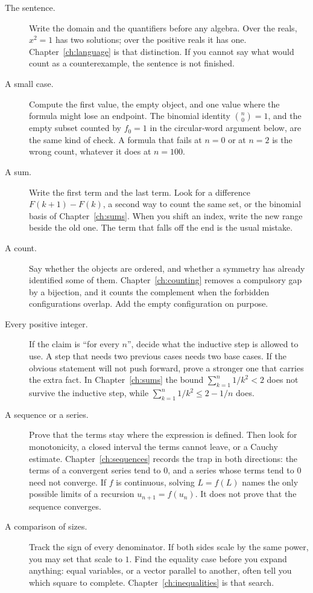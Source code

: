 \begin{description}
\item[The sentence.] Write the domain and the quantifiers before any algebra. Over the reals, $x^2=1$ has two solutions; over the positive reals it has one. Chapter~\ref{ch:language} is that distinction. If you cannot say what would count as a counterexample, the sentence is not finished.
\item[A small case.] Compute the first value, the empty object, and one value where the formula might lose an endpoint. The binomial identity $\binom n0=1$, and the empty subset counted by $f_0=1$ in the circular-word argument below, are the same kind of check. A formula that fails at $n=0$ or at $n=2$ is the wrong count, whatever it does at $n=100$.
\item[A sum.] Write the first term and the last term. Look for a difference $F(k+1)-F(k)$, a second way to count the same set, or the binomial basis of Chapter~\ref{ch:sums}. When you shift an index, write the new range beside the old one. The term that falls off the end is the usual mistake.
\item[A count.] Say whether the objects are ordered, and whether a symmetry has already identified some of them. Chapter~\ref{ch:counting} removes a compulsory gap by a bijection, and it counts the complement when the forbidden configurations overlap. Add the empty configuration on purpose.
\item[Every positive integer.] If the claim is ``for every $n$'', decide what the inductive step is allowed to use. A step that needs two previous cases needs two base cases. If the obvious statement will not push forward, prove a stronger one that carries the extra fact. In Chapter~\ref{ch:sums} the bound $\sum_{k=1}^n 1/k^2<2$ does not survive the inductive step, while $\sum_{k=1}^n 1/k^2\le 2-1/n$ does.
\item[A sequence or a series.] Prove that the terms stay where the expression is defined. Then look for monotonicity, a closed interval the terms cannot leave, or a Cauchy estimate. Chapter~\ref{ch:sequences} records the trap in both directions: the terms of a convergent series tend to $0$, and a series whose terms tend to $0$ need not converge. If $f$ is continuous, solving $L=f(L)$ names the only possible limits of a recursion $u_{n+1}=f(u_n)$. It does not prove that the sequence converges.
\item[A comparison of sizes.] Track the sign of every denominator. If both sides scale by the same power, you may set that scale to $1$. Find the equality case before you expand anything: equal variables, or a vector parallel to another, often tell you which square to complete. Chapter~\ref{ch:inequalities} is that search.

\end{description}
